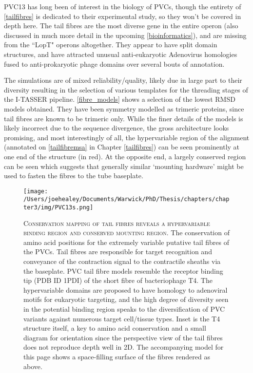 PVC13 has long been of interest in the biology of PVCs, though the entirety of \vref{tailfibres} is dedicated to their experimental study, so they won't be covered in depth here. The tail fibres are the most diverse gene in the entire operon (also discussed in much more detail in the upcoming \ref{bioinformatics}), and are missing from the ``LopT" operons altogether. They appear to have split domain structures, and have attracted unusual anti-eukaryotic Adenovirus homologies fused to anti-prokaryotic phage domains over several bouts of annotation.

The simulations are of mixed reliability/quality, likely due in large part to their diversity resulting in the selection of various templates for the threading stages of the I-TASSER pipeline. \vref{fibre_models} shows a selection of the lowest RMSD models obtained. They have been symmetry modelled as trimeric proteins, since tail fibres are known to be trimeric only. While the finer details of the models is likely incorrect due to the sequence divergence, the gross architecture looks promising, and most interestingly of all, the hypervariable region of the alignment (annotated on \vref{tailfibremsa} in Chapter \ref{tailfibres}) can be seen prominently at one end of the structure (in red). At the opposite end, a largely conserved region can be seen which suggests that generally similar `mounting hardware' might be used to fasten the fibres to the tube baseplate.

\begin{landscape}
\begin{figure}[p]
 \centering
   \texttt{[image: /Users/joehealey/Documents/Warwick/PhD/Thesis/chapters/chapter3/img/PVC13s.png]}
 \captionsetup{singlelinecheck=off, justification=justified, font=footnotesize, aboveskip=10pt}
 \caption[Conservation mapping off putative tail fibre structures]{\textsc{\normalsize Conservation mapping of tail fibres reveals a hypervariable binding region and conserved mounting region.}\vspace{0.1cm} \newline The conservation of amino acid positions for the extremely variable putative tail fibres of the PVCs. Tail fibres are responsible for target recognition and conveyance of the contraction signal to the contractile sheaths via the baseplate. PVC tail fibre models resemble the receptor binding tip (PDB ID 1PDI) of the short fibre of bacteriophage T4. The hypervariable domains are proposed to have homology to adenoviral motifs for eukaryotic targeting, and the high degree of diversity seen in the potential binding region speaks to the diversification of PVC variants against numerous target cell/tissue types. Inset is the T4 structure itself, a key to amino acid conservation and a small diagram for orientation since the perspective view of the tail fibres does not reproduce depth well in 2D. The accompanying model for this page shows a space-filling surface of the fibres rendered as above. }
 \label{fibre_models}
\end{figure}
\end{landscape}


